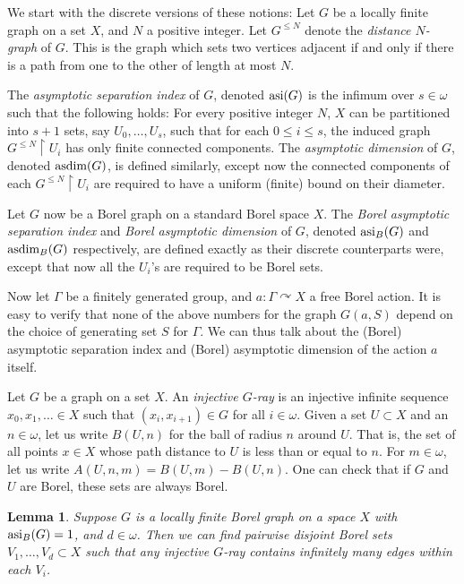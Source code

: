 \documentclass[12pt]{article}
\newcommand{\0}{\varnothing}
\newcommand{\asdim}{\textnormal{asdim}}
\newcommand{\asi}{\textnormal{asi}}
\newcommand{\res}{\upharpoonright}
\newtheorem{lemma}{Lemma}
\begin{document}
We start with the discrete versions of these notions: Let $G$ be a locally finite graph on a set $X$, and $N$ a positive integer. Let $G^{\leq N}$ denote the \textit{distance $N$-graph} of $G$. This is the graph which sets two vertices adjacent if and only if there is a path from one to the other of length at most $N$.

The \textit{asymptotic separation index} of $G$, denoted $\asi(G)$ is the infimum over $s \in \omega$ such that the following holds: For every positive integer $N$, $X$ can be partitioned into $s+1$ sets, say $U_0,\ldots,U_s$, such that for each $0 \leq i \leq s$, the induced graph $G^{\leq N} \res U_i$ has only finite connected components. The \textit{asymptotic dimension} of $G$, denoted $\asdim(G)$, is defined similarly, except now the connected components of each $G^{\leq N} \res U_i$ are required to have a uniform (finite) bound on their diameter. 

 Let $G$ now be a Borel graph on a standard Borel space $X$. The \textit{Borel asymptotic separation index} and \textit{Borel asymptotic dimension} of $G$, denoted $\asi_B(G)$ and $\asdim_B(G)$ respectively, are defined exactly as their discrete counterparts were, except that now all the $U_i$'s are required to be Borel sets.
 
 Now let $\Gamma$ be a finitely generated group, and $a:\Gamma \curvearrowright X$ a free Borel action. It is easy to verify that none of the above numbers for the graph $G(a,S)$ depend on the choice of generating set $S$ for $\Gamma$. We can thus talk about the (Borel) asymptotic separation index and (Borel) asymptotic dimension of the action $a$ itself.

Let $G$ be a graph on a set $X$. An \textit{injective $G$-ray} is an injective infinite sequence $x_0,x_1,\ldots \in X$ such that $(x_i,x_{i+1}) \in G$ for all $i \in \omega$. Given a set $U \subset X$ and an $n \in \omega$, let us write $B(U,n)$ for the ball of radius $n$ around $U$. That is, the set of all points $x \in X$ whose path distance to $U$ is less than or equal to $n$. For $m \in \omega$, let us write $A(U,n,m) = B(U,m)-B(U,n)$. One can check that if $G$ and $U$ are Borel, these sets are always Borel.

\begin{lemma}\label{lem:rainbow}
Suppose $G$ is a locally finite Borel graph on a space $X$ with $\asi_B(G) = 1$, and $d \in \omega$. Then we can find pairwise disjoint Borel sets $V_1,\ldots,V_d \subset X$ such that any injective $G$-ray contains infinitely many edges within each $V_i$.
\end{lemma}
\end{document}
